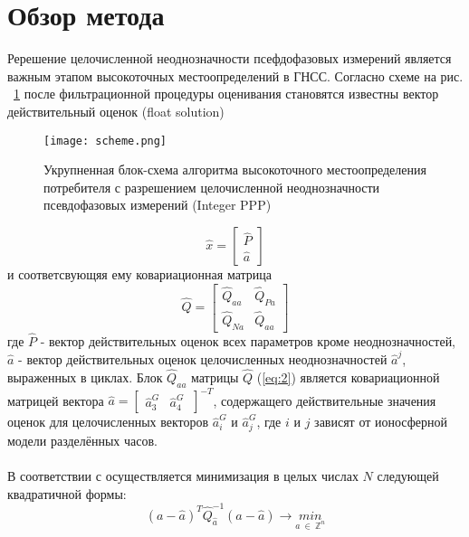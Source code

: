 \documentclass[12pt]{matmex-diploma}
\begin{document}
\section{Обзор метода}
Ререшение целочисленной неоднозначности псефдофазовых измерений является важным
этапом высокоточных местоопределений в ГНСС. Согласно схеме на рис.
~\ref{fig:pppscheme} после фильтрационной процедуры оценивания становятся известны
вектор действительный оценок (float solution) 
\begin{figure}[h]
\centering
\texttt{[image: scheme.png]}
\caption{Укрупненная блок-схема алгоритма высокоточного местоопределения потребителя с
разрешением целочисленной неоднозначности псевдофазовых измерений (Integer PPP)  \cite{article:ppp}}
\label{fig:pppscheme}
\end{figure}
\newpage
\begin{equation}
    \hat{x} = 
    \begin{bmatrix}
    \hat{P}\\
    \hat{a}
    \label{eq:1}
    \end{bmatrix}
\end{equation} и соответсвующяя ему ковариационная матрица
\begin{equation}
    \hat{Q} = 
    \begin{bmatrix}
    \hat{Q}_{aa}& \hat{Q}_{Pa}\\
    \hat{Q}_{Na}& \hat{Q}_{aa}
    \label{eq:2}
    \end{bmatrix}
\end{equation}
где $\hat{P}$ - вектор действительных оценок всех параметров кроме неоднозначностей, $\hat{a}$ - вектор
действительных оценок целочисленных неоднозначностей $\hat{a}^{j}$, выраженных в циклах. Блок $\hat{Q}_{aa}$ матрицы $\hat{Q}$  (\ref{eq:2}) является ковариационной матрицей вектора $\hat{a} = 
    \begin{bmatrix}
    \hat{a}^{G}_{3}& \hat{a}^{G}_{4}\
    \end{bmatrix}^{-T}$, содержащего действительные значения оценок для целочисленных векторов $\hat{a}^{G}_{i}$ и $\hat{a}^{G}_{j}$, где $i$ и $j$ зависят от ионосферной модели разделённых часов. \\ \\ В соответствии с \cite{article:lambda} осуществляется минимизация в целых числах $N$ следующей квадратичной формы:
    \begin{equation}
        (a-\hat{a})^{T}\hat{Q}_{\hat{a}}^{-1}(a-\hat{a})
        \longrightarrow{\underset{a \ \in \ \mathbb{Z}^n}{min}}
        \label{eq:3}
    \end{equation}
\end{document}
